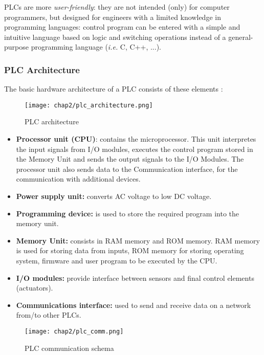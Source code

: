 \bigskip
PLCs are more \textit{user-friendly}: they are not intended (only) for computer programmers, but designed for engineers with a limited knowledge in programming languages: control program can be entered with a simple and intuitive language based on logic and switching operations instead of a general-purpose programming language (\textit{i.e.} C, C++, ...). 

\subsubsection{PLC Architecture}
The basic hardware architecture of a PLC consists of these elements \cite{plc_book}:

\begin{figure}[ht]
	\centering
	\texttt{[image: chap2/plc\_architecture.png]}
	\caption{PLC architecture}
	\label{fig:PLC_architecture}
\end{figure}

\begin{itemize}
	\item \textbf{Processor unit (CPU)}: contains the microprocessor. This unit interpretes the input signals from I/O modules, executes the control program stored in the Memory Unit and sends the output signals to the I/O Modules.
	The processor unit also sends data to the Communication interface, for the communication with additional devices.
	\item \textbf{Power supply unit:} converts AC voltage to low DC voltage.
	\item \textbf{Programming device:} is used to store the required program into the memory unit.
	\item \textbf{Memory Unit:} consists in RAM memory and ROM memory. RAM memory is used for storing data from inputs, ROM memory for storing operating system, firmware and user program to be executed by the CPU.
	\item \textbf{I/O modules:} provide interface between sensors and final control elements (actuators).
	\item \textbf{Communications interface:} used to send and receive data on a network from/to other PLCs.
\end{itemize}

\begin{figure}[ht]
	\centering
	\texttt{[image: chap2/plc\_comm.png]}
	\caption{PLC communication schema}
	\label{fig:PLC_comm}
\end{figure}

